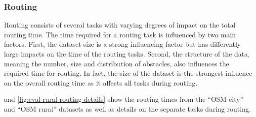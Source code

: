 		\subsubsection{Routing}
		
			Routing consists of several tasks with varying degrees of impact on the total routing time.
			The time required for a routing task is influenced by two main factors.
			First, the dataset size is a strong influencing factor but has differently large impacts on the time of the routing tasks.
			Second, the structure of the data, meaning the number, size and distribution of obstacles, also influences the required time for routing.
			In fact, the size of the dataset is the strongest influence on the overall routing time as it affects all tasks during routing.
			
			 and \ref{fig:eval-rural-routing-details} show the routing times from the \enquote{OSM city} and \enquote{OSM rural} datasets as well as details on the separate tasks during routing.
		
